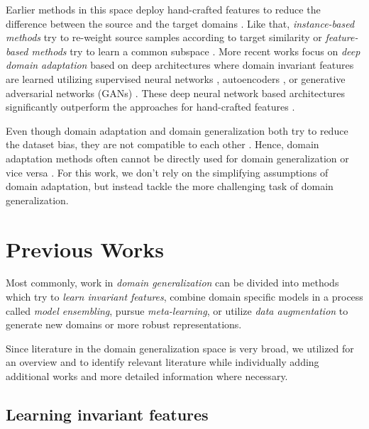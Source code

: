 Earlier methods in this space deploy hand-crafted features to reduce the difference between the source and the target domains \citep{ManciniPBC018}. Like that, \emph{instance-based methods} try to re-weight source samples according to target similarity \citep{GongGS13, HuangSGBS06, YamadaSR12} or \emph{feature-based methods} try to learn a common subspace \citep{FernandoHST13, GongSSG12, LongD0SGY13, BaktashmotlaghHLS13}. More recent works focus on \emph{deep domain adaptation} based on deep architectures where domain invariant features are learned utilizing supervised neural networks \citep{BousmalisTSKE16, CarlucciPCRB17, GaninL15, GhifaryKZBL16}, autoencoders \citep{ZengOWW14}, or generative adversarial networks (GANs) \citep{BousmalisSDEK17, ShrivastavaPTSW17, TzengHSD17}. These deep neural network based architectures significantly outperform the approaches for hand-crafted features \citep{ManciniPBC018}.

Even though domain adaptation and domain generalization both try to reduce the dataset bias, they are not compatible to each other \citep{GhifaryBKZ17}. Hence, domain adaptation methods often cannot be directly used for domain generalization or vice versa \citep{GhifaryBKZ17}. For this work, we don't rely on the simplifying assumptions of domain adaptation, but instead tackle the more challenging task of domain generalization.

\section{Previous Works}

Most commonly, work in \emph{domain generalization} can be divided into methods which try to \emph{learn invariant features}, combine domain specific models in a process called \emph{model ensembling}, pursue \emph{meta-learning}, or utilize \emph{data augmentation} to generate new domains or more robust representations.

Since literature in the domain generalization space is very broad, we utilized \citet[Appendix A]{gulrajani2020search} for an overview and to identify relevant literature while individually adding additional works and more detailed information where necessary.  

\subsection{Learning invariant features}
\label{sec:invariant_features}

